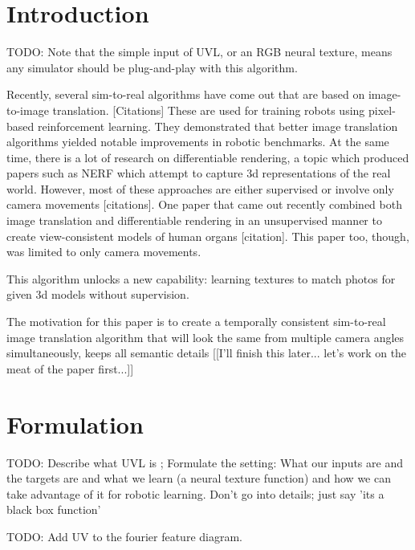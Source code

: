 \documentclass{article}
\begin{document}

\section{Introduction}
	

TODO: Note that the simple input of UVL, or an RGB neural texture, means any simulator should be plug-and-play with this algorithm.

Recently, several sim-to-real algorithms have come out that are based on image-to-image translation. [Citations]
These are used for training robots using pixel-based reinforcement learning.
They demonstrated that better image translation algorithms yielded notable improvements in robotic benchmarks.
At the same time, there is a lot of research on differentiable rendering,
a topic which produced papers such as NERF which attempt to capture 3d representations of the real world.
However, most of these approaches are either supervised or involve only camera movements [citations].
One paper that came out recently combined both image translation and differentiable rendering in an unsupervised manner to create view-consistent models of human organs [citation].
This paper too, though, was limited to only camera movements.

This algorithm unlocks a new capability: learning textures to match photos for given 3d models without supervision.

The motivation for this paper is to create a temporally consistent sim-to-real image translation algorithm that will look the same from multiple camera angles simultaneously, keeps all semantic details 
[[I'll finish this later... let's work on the meat of the paper first...]]

		



\section{Formulation}
\label{sec:data}


TODO: Describe what UVL is ; 
Formulate the setting: What our inputs are and the targets are and what we learn (a neural texture function) and how we can take advantage of it for robotic learning.
Don't go into details; just say 'its a black box function'

TODO: Add UV to the fourier feature diagram.
\end{document}
